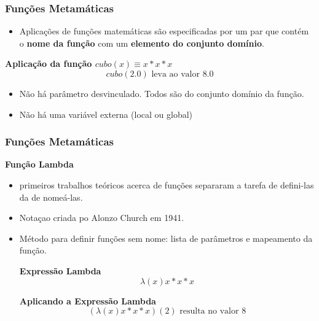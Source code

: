 \begin{frame}
	\frametitle{Funções Metamáticas}
	\begin{itemize}
		\item Aplicações de funções matemáticas são especificadas por um par que contém o \textbf{nome da função} com um \textbf{elemento do conjunto domínio}.
	\end{itemize}

	\begin{block}{\textbf{Aplicação da função $cubo(x) \equiv x * x * x$}}
		\[ cubo(2.0) \mbox{ leva ao valor } 8.0 \]
	\end{block}

	\begin{itemize}
		\item Não há parâmetro desvinculado. Todos são do conjunto domínio da função.
		\item Não há uma variável externa (local ou global)
	\end{itemize}
\end{frame}


\begin{frame}
	\frametitle{Funções Metamáticas}
	\textbf{Função Lambda}
	\begin{itemize}
		\item primeiros trabalhos teóricos acerca de funções separaram a tarefa de defini-las da de nomeá-las.
		\item Notaçao criada po Alonzo Church em 1941.
		\item Método para definir funções sem nome: lista de parâmetros e mapeamento da função.
		\begin{block}{\textbf{Expressão Lambda}}
			\[ \lambda(x)x*x*x \]
		\end{block}

		\begin{block}{\textbf{Aplicando a Expressão Lambda}}
			\[ (\lambda(x)x*x*x)(2) \mbox{ resulta no valor } 8\]
		\end{block}
	\end{itemize}
\end{frame}




